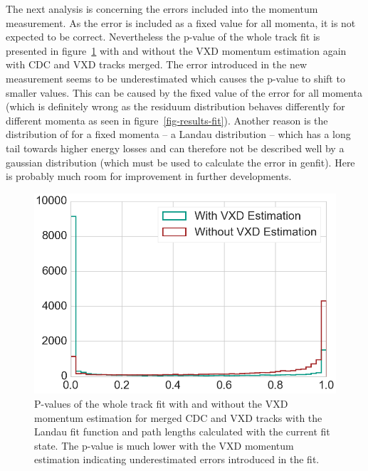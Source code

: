 


The next analysis is concerning the errors included into the momentum measurement. As the error is included as a fixed value for all momenta, it is not expected to be correct. Nevertheless the p-value of the whole track fit is presented in figure~\ref{fig-p-values} with and without the VXD momentum estimation again with CDC and VXD tracks merged. The error introduced in the new measurement seems to be underestimated which causes the p-value to shift to smaller values. This can be caused by the fixed value of the error for all momenta (which is definitely wrong as the residuum distribution behaves differently for different momenta as seen in figure~\ref{fig-results-fit}). Another reason is the distribution of \dedx for a fixed momenta -- a Landau distribution -- which has a long tail towards higher energy losses and can therefore not be described well by a gaussian distribution (which must be used to calculate the error in genfit). Here is probably much room for improvement in further developments.

\begin{figure}
  \centering
  \includegraphics[width=0.7\linewidth]{figures/vxd/pValue.png}
  \caption[P-values of the whole track fit]{P-values of the whole track fit with and without the VXD momentum estimation for merged CDC and VXD tracks with the Landau fit function and path lengths calculated with the current fit state. The p-value is much lower with the VXD momentum estimation indicating underestimated errors introduced in the fit.}
  \label{fig-p-values}
\end{figure}


